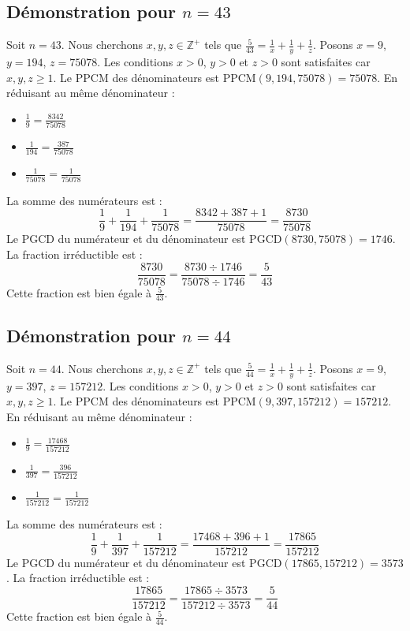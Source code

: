 \documentclass[11pt,a4paper]{article}
\begin{document}
\subsection{Démonstration pour $n = 43$}
Soit $n = 43$. Nous cherchons $x, y, z \in \mathbb{Z}^{+}$ tels que $\frac{5}{43} = \frac{1}{x} + \frac{1}{y} + \frac{1}{z}$.
Posons $x = 9$, $y = 194$, $z = 75078$.
Les conditions $x > 0$, $y > 0$ et $z > 0$ sont satisfaites car $x, y, z \geq 1$.
Le PPCM des dénominateurs est $\text{PPCM}(9, 194, 75078) = 75078$.
En réduisant au même dénominateur :
\begin{itemize}
    \item $\frac{1}{9} = \frac{8342}{75078}$
    \item $\frac{1}{194} = \frac{387}{75078}$
    \item $\frac{1}{75078} = \frac{1}{75078}$
\end{itemize}
La somme des numérateurs est :
$$ \frac{1}{9} + \frac{1}{194} + \frac{1}{75078} = \frac{8342 + 387 + 1}{75078} = \frac{8730}{75078} $$
Le PGCD du numérateur et du dénominateur est $\text{PGCD}(8730, 75078) = 1746$.
La fraction irréductible est :
$$ \frac{8730}{75078} = \frac{8730 \div 1746}{75078 \div 1746} = \frac{5}{43} $$
Cette fraction est bien égale à $\frac{5}{43}$.

\subsection{Démonstration pour $n = 44$}
Soit $n = 44$. Nous cherchons $x, y, z \in \mathbb{Z}^{+}$ tels que $\frac{5}{44} = \frac{1}{x} + \frac{1}{y} + \frac{1}{z}$.
Posons $x = 9$, $y = 397$, $z = 157212$.
Les conditions $x > 0$, $y > 0$ et $z > 0$ sont satisfaites car $x, y, z \geq 1$.
Le PPCM des dénominateurs est $\text{PPCM}(9, 397, 157212) = 157212$.
En réduisant au même dénominateur :
\begin{itemize}
    \item $\frac{1}{9} = \frac{17468}{157212}$
    \item $\frac{1}{397} = \frac{396}{157212}$
    \item $\frac{1}{157212} = \frac{1}{157212}$
\end{itemize}
La somme des numérateurs est :
$$ \frac{1}{9} + \frac{1}{397} + \frac{1}{157212} = \frac{17468 + 396 + 1}{157212} = \frac{17865}{157212} $$
Le PGCD du numérateur et du dénominateur est $\text{PGCD}(17865, 157212) = 3573$.
La fraction irréductible est :
$$ \frac{17865}{157212} = \frac{17865 \div 3573}{157212 \div 3573} = \frac{5}{44} $$
Cette fraction est bien égale à $\frac{5}{44}$.
\end{document}
